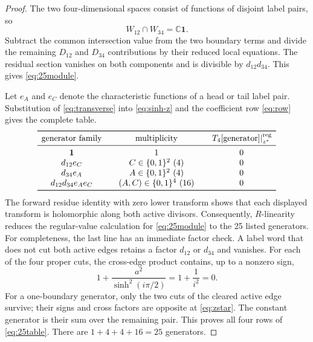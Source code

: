 \documentclass[11pt,reqno]{amsart}
\theoremstyle{definition}
\theoremstyle{remark}
\newcommand{\C}{\mathbb C}
\newcommand{\one}{\mathbf 1}
\begin{document}
\begin{proof}
The two four-dimensional spaces consist of functions of disjoint label pairs,
so
\begin{equation}
 W_{12}\cap W_{34}=\C\one.
 \label{eq:W-intersection}
\end{equation}
Subtract the common intersection value from the two boundary terms and divide
the remaining $D_{12}$ and $D_{34}$ contributions by their reduced local
equations.  The residual section vanishes on both components and is divisible
by $d_{12}d_{34}$.  This gives \eqref{eq:25module}.

Let $e_A$ and $e_C$ denote the characteristic functions of a head or tail
label pair.  Substitution of \eqref{eq:transverse} into \eqref{eq:sinh-z} and
the coefficient row \eqref{eq:row} gives the complete table.
\begin{equation}
\begin{array}{c@{\qquad}c@{\qquad}c}
\toprule
\text{generator family}&\text{multiplicity}&
 \left.T_4[\text{generator}]\right|_{z^*}^{\mathrm{reg}}\\
\midrule
\one&1&0\\
d_{12}e_C&C\in\{0,1\}^2\ (4)&0\\
d_{34}e_A&A\in\{0,1\}^2\ (4)&0\\
d_{12}d_{34}e_Ae_C&(A,C)\in\{0,1\}^4\ (16)&0\\
\bottomrule
\end{array}
\label{eq:25table}
\end{equation}
The forward residue identity with zero lower transform shows that each
displayed transform is holomorphic along both active divisors.  Consequently,
$R$-linearity reduces the regular-value calculation for
\eqref{eq:25module} to the 25 listed generators.
For completeness, the last line has an immediate factor check.  A label word
that does not cut both active edges retains a factor $d_{12}$ or $d_{34}$ and
vanishes.  For each of the four proper cuts, the cross-edge product contains,
up to a nonzero sign,
\begin{equation}
 1+\frac{a^2}{\sinh^2(i\pi/2)}=1+\frac1{i^2}=0.
 \label{eq:mixed-zero}
\end{equation}
For a one-boundary generator, only the two cuts of the cleared active edge
survive; their signs and cross factors are opposite at \eqref{eq:zstar}.
The constant generator is their sum over the remaining pair.  This proves all
four rows of \eqref{eq:25table}.  There are $1+4+4+16=25$ generators.
\end{proof}
\end{document}
